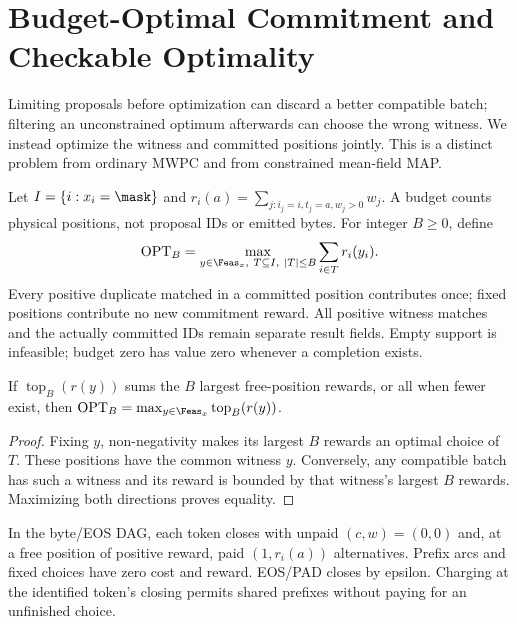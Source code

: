 \section{Budget-Optimal Commitment and Checkable Optimality}
\label{sec:budgeted}

Limiting proposals before optimization can discard a better compatible batch; filtering an unconstrained optimum afterwards can choose the wrong witness. We instead optimize the witness and committed positions jointly. This is a distinct problem from ordinary MWPC and from constrained mean-field MAP.

Let $I=\{i:x_i=\mask\}$ and $r_i(a)=\sum_{j:i_j=i,t_j=a,w_j>0}w_j$. A budget counts physical positions, not proposal IDs or emitted bytes. For integer $B\geq0$, define
\begin{equation}
 \operatorname{OPT}_B=\max_{y\in\Feas_x,\ T\subseteq I,\ |T|\leq B}
       \sum_{i\in T}r_i(y_i).
 \label{eq:budget-objective}
\end{equation}
Every positive duplicate matched in a committed position contributes once; fixed positions contribute no new commitment reward. All positive witness matches and the actually committed IDs remain separate result fields. Empty support is infeasible; budget zero has value zero whenever a completion exists.

\begin{lemma}
If $\operatorname{top}_B(r(y))$ sums the $B$ largest free-position rewards, or all when fewer exist, then $\operatorname{OPT}_B=\max_{y\in\Feas_x}\operatorname{top}_B(r(y))$.
\end{lemma}
\begin{proof}
Fixing $y$, non-negativity makes its largest $B$ rewards an optimal choice of $T$. These positions have the common witness $y$. Conversely, any compatible batch has such a witness and its reward is bounded by that witness's largest $B$ rewards. Maximizing both directions proves equality.
\end{proof}

In the byte/EOS DAG, each token closes with unpaid $(c,w)=(0,0)$ and, at a free position of positive reward, paid $(1,r_i(a))$ alternatives. Prefix arcs and fixed choices have zero cost and reward. EOS/PAD closes by epsilon. Charging at the identified token's closing permits shared prefixes without paying for an unfinished choice.

